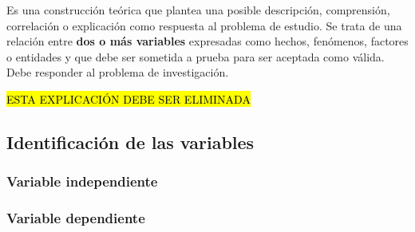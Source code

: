 Es una construcci\'{o}n te\'{o}rica que plantea una posible descripci\'{o}n, comprensi\'{o}n, 
correlaci\'{o}n o explicaci\'{o}n como respuesta al problema de estudio. Se trata de una 
relaci\'{o}n entre \textbf{dos o m\'{a}s variables} expresadas como hechos, fen\'{o}menos, 
factores o entidades y que debe ser sometida a prueba para ser aceptada como v\'{a}lida. Debe 
responder al problema de investigaci\'{o}n.

\hl{ESTA EXPLICACI\'{O}N DEBE SER ELIMINADA} 


\subsection{Identificaci\'on de las variables}
\label{cap0:sub:identificacion_de_las_variables}

\subsubsection{Variable independiente}
\label{cap0:sub:variable_independiente}

\subsubsection{Variable dependiente}
\label{cap0:sub:variable_dependiente}



\renewcommand*{\thesection}{\thechapter.\arabic{section}}
\makeatletter\renewcommand*{\@chapapp}{\chaptername}\makeatother

